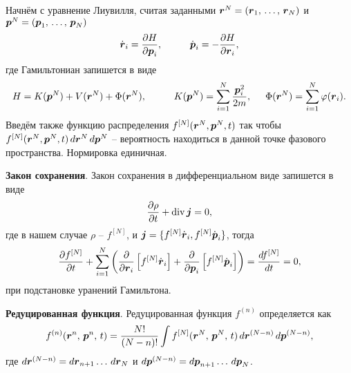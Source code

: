 Начнём с уравнение Лиувилля, считая заданными $\boldsymbol{r}^N = (\boldsymbol{r}_1,\,  \ldots,\, \boldsymbol{r}_N)$ и $\boldsymbol{p}^N = (\boldsymbol{p}_1,\,  \ldots,\, \boldsymbol{p}_N)$
\begin{equation*}
	\dot{\vc{r}}_i = \frac{\partial H}{\partial \vc{p}_i},
	\hspace{10 mm} 
	\dot{\vc{p}}_i = -\frac{\partial H}{\partial \vc{r}_i},
\end{equation*}
где Гамильтониан запишется в виде
\begin{equation*}
	H = K(\vc{p}^N) + V(\vc{r}^N) + \Phi (\vc{r}^N),
	\hspace{10 mm} 
	K(\vc{p}^N) = \sum_{i=1}^{N} \frac{\vc{p}_i^2}{2m},
	\hspace{5 mm} 
	\Phi (\vc{r}^N) = \sum_{i=1}^{N} \varphi (\vc{r}_i).
\end{equation*}
Введём также функцию распределения $f^{[N]}(\boldsymbol{r}^N, \boldsymbol{p}^N, t)$ так чтобы $f^{[N]}(\boldsymbol{r}^N, \boldsymbol{p}^N, t) \, d \boldsymbol{r}^N \, d \boldsymbol{p}^N$ -- вероятность находиться в данной точке фазового пространства. Нормировка единичная. 

\textbf{Закон сохранения}.
Закон сохранения в дифференциальном виде запишется в виде
\begin{equation*}
	\frac{\partial \rho}{\partial t} + \mathop{\mathrm{div}}\nolimits \boldsymbol{j} = 0,
\end{equation*}
где в нашем случае $\rho$ -- $f^{[N]}$, и $\boldsymbol{j} = \{f^{[N]} \dot{\boldsymbol{r}}_i, f^{[N]} \dot{\boldsymbol{p}}_i\}$, тогда
\begin{equation*}
	\frac{\partial f^{[N]}}{\partial t} + \sum_{i=1}^{N}\left( \frac{\partial }{\partial \boldsymbol{r}_i} \left[f^{[N]} \dot{\boldsymbol{r}}_i\right] + \frac{\partial }{\partial \boldsymbol{p}_i} \left[
				f^{[N]} \dot{\boldsymbol{p}}_i
			\right]\right) = \frac{d f^{[N]}}{d t} = 0, 
\end{equation*}
при подстановке уранений Гамильтона. 



\textbf{Редуцированная функция}. Редуцированная функция $f^{(n)}$ определяется как
\begin{equation*}
	f^{(n)} (\boldsymbol{r}^n,\, \boldsymbol{p}^n,\, t) = \frac{N!}{(N-n)!} \int f^{[N]} (\boldsymbol{r}^N,\, \boldsymbol{p}^N,\, t) \, d \boldsymbol{r}^{(N-n)} \, d \boldsymbol{p}^{(N-n)},
\end{equation*}
где $d \boldsymbol{r}^{(N-n)} = d \boldsymbol{r}_{n+1} \ldots \, d \boldsymbol{r}_N$ и $d \boldsymbol{p}^{(N-n)} = d \boldsymbol{p}_{n+1} \ldots \, d \boldsymbol{p}_N$. 

